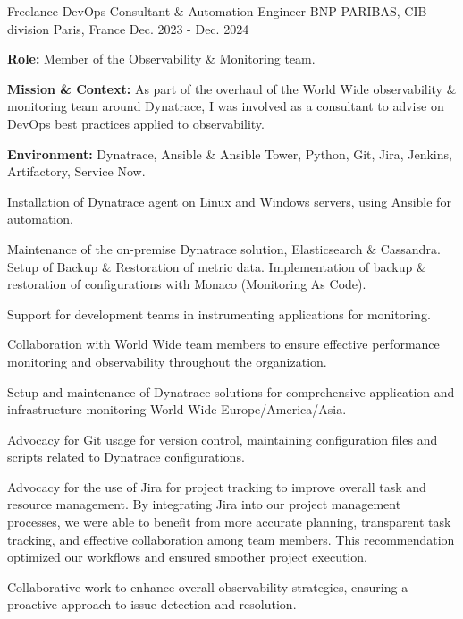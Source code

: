 \begin{cventries}
\cventry
{Freelance DevOps Consultant \& Automation Engineer} %
{BNP PARIBAS, CIB division} %
{Paris, France} %
{Dec. 2023 - Dec. 2024} %
{
  \begin{cvitems} %
    \item {\textbf{Role:} Member of the Observability \& Monitoring team.}
    \item {\textbf{Mission \& Context:} As part of the overhaul of the World Wide observability \& monitoring team around Dynatrace, I was involved as a consultant to advise on DevOps best practices applied to observability.}
    \item {\textbf{Environment:} Dynatrace, Ansible \& Ansible Tower, Python, Git, Jira, Jenkins, Artifactory, Service Now.}
    \item {Installation of Dynatrace agent on Linux and Windows servers, using Ansible for automation.}
    \item {Maintenance of the on-premise Dynatrace solution, Elasticsearch \& Cassandra. Setup of Backup \& Restoration of metric data. Implementation of backup \& restoration of configurations with Monaco (Monitoring As Code).}
    \item {Support for development teams in instrumenting applications for monitoring.}
    \item {Collaboration with World Wide team members to ensure effective performance monitoring and observability throughout the organization.}
    \item {Setup and maintenance of Dynatrace solutions for comprehensive application and infrastructure monitoring World Wide Europe/America/Asia.}
    \item {Advocacy for Git usage for version control, maintaining configuration files and scripts related to Dynatrace configurations.}
    \item {Advocacy for the use of Jira for project tracking to improve overall task and resource management. By integrating Jira into our project management processes, we were able to benefit from more accurate planning, transparent task tracking, and effective collaboration among team members. This recommendation optimized our workflows and ensured smoother project execution.}
    \item {Collaborative work to enhance overall observability strategies, ensuring a proactive approach to issue detection and resolution.}
  \end{cvitems}
}


\end{cventries}
